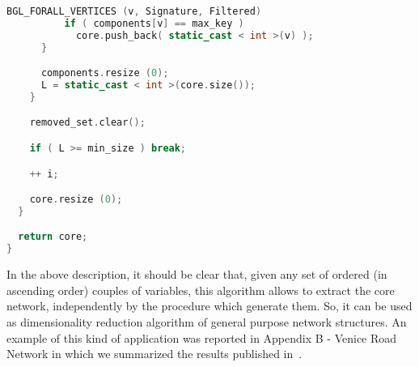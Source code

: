 \documentclass{standalone}
\begin{document}
\begin{lstlisting}[language=C++, caption=DNetPRO signature extraction, label=code:featuresel]
        BGL_FORALL_VERTICES (v, Signature, Filtered)
          if ( components[v] == max_key )
            core.push_back( static_cast < int >(v) );
      }

      components.resize (0);
      L = static_cast < int >(core.size());
    }

    removed_set.clear();

    if ( L >= min_size ) break;

    ++ i;

    core.resize (0);
  }

  return core;
}

\end{lstlisting}

In the above description, it should be clear that, given any set of ordered (in ascending order) couples of variables, this algorithm allows to extract the core network, independently by the procedure which generate them.
So, it can be used as dimensionality reduction algorithm of general purpose network structures.
An example of this kind of application was reported in Appendix B - Venice Road Network in which we summarized the results published in~\cite{Mizzi2018, CurtiSDPS2018}.
\end{document}
